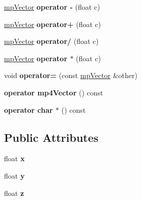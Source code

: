 \begin{DoxyCompactItemize}
\item 
\mbox{\label{classmp_vector_abb9c12b0dcdf4b478033bbaeedc547ed}} 
\mbox{\hyperlink{classmp_vector}{mp\+Vector}} {\bfseries operator -\/} (float c)
\item 
\mbox{\label{classmp_vector_aab80b549bf738e201f73d1854277eef5}} 
\mbox{\hyperlink{classmp_vector}{mp\+Vector}} {\bfseries operator+} (float c)
\item 
\mbox{\label{classmp_vector_ad6c1e92ad7214115ea00b055160ace9e}} 
\mbox{\hyperlink{classmp_vector}{mp\+Vector}} {\bfseries operator/} (float c)
\item 
\mbox{\label{classmp_vector_a3257b406d12ea1e237b0c3778f66e476}} 
\mbox{\hyperlink{classmp_vector}{mp\+Vector}} {\bfseries operator $\ast$} (float c)
\item 
\mbox{\label{classmp_vector_aa4a1f20d6d512fafd9de35243cb7748e}} 
void {\bfseries operator=} (const \mbox{\hyperlink{classmp_vector}{mp\+Vector}} \&other)
\item 
\mbox{\label{classmp_vector_a2e7fe1ade5c929ddc9e818e731c4f7c6}} 
{\bfseries operator mp4\+Vector} () const
\item 
\mbox{\label{classmp_vector_af21bfd2731de6b29b628ac4e7c45ed59}} 
{\bfseries operator char $\ast$} () const
\end{DoxyCompactItemize}
\subsection*{Public Attributes}
\begin{DoxyCompactItemize}
\item 
\mbox{\label{classmp_vector_ac8f78db70d53f53c0e8bbd1b64f9fbb8}} 
float {\bfseries x}
\item 
\mbox{\label{classmp_vector_a24c16cd5525eb36d9dc35ee4c82a460f}} 
float {\bfseries y}
\item 
\mbox{\label{classmp_vector_a8a72671587b9d23b583a97d5efa7cb3c}} 
float {\bfseries z}
\end{DoxyCompactItemize}
